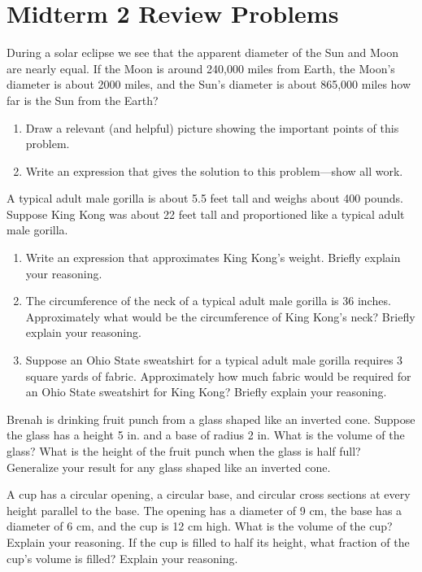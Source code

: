 \newpage

\section{Midterm 2 Review Problems}

\begin{prob}
During a solar eclipse we see that the apparent diameter of the Sun and Moon are nearly equal. If the Moon is around 240,000 miles from Earth, the Moon's diameter is about 2000 miles, and the Sun's diameter is about 865,000 miles how far is the Sun from the Earth?
\begin{enumerate}
\item Draw a relevant (and helpful) picture showing the important points of this problem.
\item Write an expression that gives the solution to this problem---show all work.
\end{enumerate}
\end{prob}

\begin{prob}
A typical adult male gorilla is about 5.5 feet tall and weighs about 400 pounds. Suppose King Kong was about 22 feet tall and proportioned like a typical adult male gorilla.
\begin{enumerate}
\item Write an expression that approximates King Kong's weight. Briefly explain your reasoning.
\item The circumference of the neck of a typical adult male gorilla is 36 inches. Approximately what would be the circumference of King Kong's neck? Briefly explain your reasoning.
\item Suppose an Ohio State sweatshirt for a typical adult male gorilla requires 3 square yards of fabric.  Approximately how much fabric would be required for an Ohio State sweatshirt for King Kong?  Briefly explain your reasoning.
\end{enumerate}
\end{prob}

\begin{prob}
Brenah is drinking fruit punch from a glass shaped like an inverted cone.  Suppose the glass has a height 5 in. and a base of radius 2 in.  What is the volume of the glass?  What is the height of the fruit punch when the glass is half full?  Generalize your result for any glass shaped like an inverted cone.  
\end{prob}

\begin{prob}
A cup has a circular opening, a circular base, and circular cross sections at every height parallel to the base.  The opening has a diameter of 9 cm, the base has a diameter of 6 cm, and the cup is 12 cm high.  
What is the volume of the cup?  Explain your reasoning.  
If the cup is filled to half its height, what fraction of the cup's volume is filled?  Explain your reasoning.  
\end{prob}


